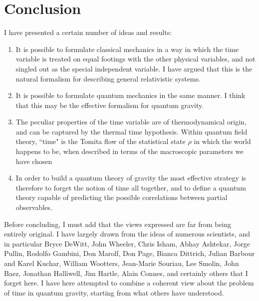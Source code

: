 \documentclass[10pt,nofootinbib]{revtex4}
\begin{document}
\section{Conclusion}

I have presented a certain number of ideas and results:
\begin{enumerate}

\item It is possible to formulate classical mechanics in a way in which the time
variable is treated on equal footings with the other physical variables, and not singled
out as the special independent variable.  I have argued that this
is the natural formalism for describing general relativistic systems. 

\item It is possible to formulate quantum mechanics in the same manner. I think that
this may be the effective formalism for quantum gravity. 

\item The peculiar properties of the time variable are of thermodynamical origin, and
can be captured by the thermal time hypothesis. Within quantum field theory, 
``time" is  the Tomita flow of the statistical state $\rho$ in which the world happens 
to be, when described in terms of the macroscopic parameters we have chosen

\item In order to build a quantum theory of gravity the most effective strategy is therefore
to forget the notion of time all together, and to define a quantum theory capable of 
predicting the possible correlations between partial observables. 

\end{enumerate}

Before concluding, I must add that the views expressed are far from being entirely 
original.  I have largely drawn from the ideas of numerous scientists, and in particular
Bryce DeWitt, John Wheeler, Chris Isham, Abhay Ashtekar, Jorge Pullin, Rodolfo 
Gambini,  Don Marolf, Don Page, Bianca Dittrich, Julian Barbour and Karel Kuchar, 
William Wootters, Jean-Marie Souriau, Lee Smolin, John Baez, Jonathan Halliwell, 
Jim Hartle, Alain Connes, and certainly others that I forget  here.  I have here attempted 
to combine a coherent view about the problem of time in quantum gravity, starting from 
what others have understood. 
\end{document}
